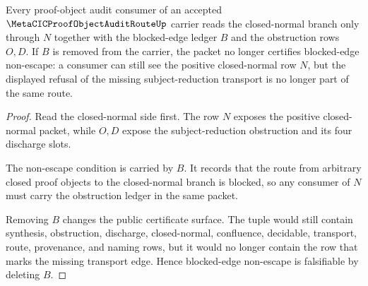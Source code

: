 \begin{theorem}
\label{thm:metacic-proof-object-audit-route-blocked-edge-nonescape}
Every proof-object audit consumer of an accepted $\MetaCICProofObjectAuditRouteUp$ carrier reads the closed-normal branch only through $N$ together with the blocked-edge ledger $B$ and the obstruction rows $O,D$. If $B$ is removed from the carrier, the packet no longer certifies blocked-edge non-escape: a consumer can still see the positive closed-normal row $N$, but the displayed refusal of the missing subject-reduction transport is no longer part of the same route.
\end{theorem}
\begin{proof}
Read the closed-normal side first. The row $N$ exposes the positive closed-normal packet, while $O,D$ expose the subject-reduction obstruction and its four discharge slots.

The non-escape condition is carried by $B$. It records that the route from arbitrary closed proof objects to the closed-normal branch is blocked, so any consumer of $N$ must carry the obstruction ledger in the same packet.

Removing $B$ changes the public certificate surface. The tuple would still contain synthesis, obstruction, discharge, closed-normal, confluence, decidable, transport, route, provenance, and naming rows, but it would no longer contain the row that marks the missing transport edge. Hence blocked-edge non-escape is falsifiable by deleting $B$.
\end{proof}

